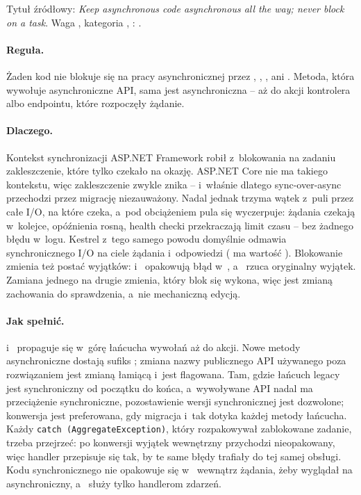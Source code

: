 Tytuł źródłowy: \emph{Keep asynchronous code asynchronous all the way; never block on a
task}. Waga , kategoria , :
.

\paragraph{Reguła.} Żaden kod nie blokuje się na pracy asynchronicznej przez
, , ,
 ani . Metoda, która wywołuje asynchroniczne
API, sama jest asynchroniczna -- aż do akcji kontrolera albo endpointu, które rozpoczęły
żądanie.

\paragraph{Dlaczego.} Kontekst synchronizacji ASP.NET Framework robił z~blokowania na
zadaniu zakleszczenie, które tylko czekało na okazję. ASP.NET Core nie ma takiego kontekstu,
więc zakleszczenie zwykle znika -- i~właśnie dlatego sync-over-async przechodzi przez
migrację niezauważony. Nadal jednak trzyma wątek z~puli przez całe I/O, na które czeka, a~pod
obciążeniem pula się wyczerpuje: żądania czekają w~kolejce, opóźnienia rosną, health checki
przekraczają limit czasu -- bez żadnego błędu w~logu. Kestrel z~tego samego powodu domyślnie
odmawia synchronicznego I/O na ciele żądania i~odpowiedzi (
ma wartość ). Blokowanie zmienia też postać wyjątków: 
i~ opakowują błąd w~, a~
rzuca oryginalny wyjątek. Zamiana jednego na drugie zmienia, który blok 
się wykona, więc jest zmianą zachowania do sprawdzenia, a~nie mechaniczną edycją.

\paragraph{Jak spełnić.}  i~ propaguje się w~górę łańcucha
wywołań aż do akcji. Nowe metody asynchroniczne dostają sufiks ; zmiana nazwy
publicznego API używanego poza rozwiązaniem jest zmianą łamiącą i~jest flagowana. Tam,
gdzie łańcuch legacy jest synchroniczny od początku do końca, a~wywoływane API nadal ma
przeciążenie synchroniczne, pozostawienie wersji synchronicznej jest dozwolone; konwersja
jest preferowana, gdy migracja i~tak dotyka każdej metody łańcucha. Każdy
\texttt{catch (AggregateException)}, który rozpakowywał zablokowane zadanie, trzeba
przejrzeć: po konwersji wyjątek wewnętrzny przychodzi nieopakowany, więc handler przepisuje
się tak, by te same błędy trafiały do tej samej obsługi. Kodu synchronicznego nie opakowuje
się w~ wewnątrz żądania, żeby wyglądał na asynchroniczny, a~ służy tylko handlerom zdarzeń.

